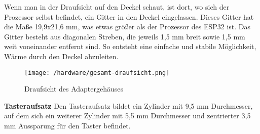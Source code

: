\documentclass[11pt, twoside]{article}
\begin{document}
Wenn man in der Draufsicht auf den Deckel schaut, ist dort, wo sich der Prozessor selbst befindet, ein Gitter in den Deckel eingelassen. Dieses Gitter hat die Maße 19,9x21,6 mm, was etwas größer als der Prozessor des ESP32 ist. Das Gitter besteht aus diagonalen Streben, die jeweils 1,5 mm breit sowie 1,5 mm weit voneinander entfernt sind. So entsteht eine einfache und stabile Möglichkeit, Wärme durch den Deckel abzuleiten.\newline
\begin{figure}[H]
	\texttt{[image: /hardware/gesamt-draufsicht.png]}
	\caption{Draufsicht des Adaptergehäuses}
\end{figure}
\noindent \textbf{Tasteraufsatz} \newline
Den Tasteraufsatz bildet ein Zylinder mit 9,5 mm Durchmesser, auf dem sich ein weiterer Zylinder mit 5,5 mm Durchmesser und zentrierter 3,5 mm Aussparung für den Taster befindet.
\vspace{4mm}\newline
\parencite[vgl.][]{noauthor_urlnl12_nodate}\newline
\parencite[vgl.][]{noauthor_urlnl17_nodate}
\end{document}
